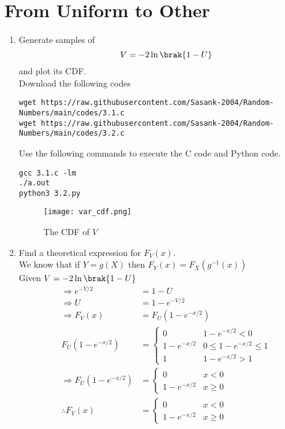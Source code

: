 \documentclass[journal,12pt,twocolumn]{IEEEtran}
\renewcommand\thesection{\arabic{section}}
\begin{document}
\section{From Uniform to Other}
\begin{enumerate}[label=\thesection.\arabic*
,ref=\thesection.\theenumi]
%
\item
Generate samples of 
%
\begin{equation}
V = -2\ln\brak{1-U}
\end{equation}
%
and plot its CDF.  \\
\solution Download the following codes
\begin{lstlisting}
wget https://raw.githubusercontent.com/Sasank-2004/Random-Numbers/main/codes/3.1.c
wget https://raw.githubusercontent.com/Sasank-2004/Random-Numbers/main/codes/3.2.c
\end{lstlisting}
Use the following commands to execute the C code and Python code.
\begin{lstlisting}
gcc 3.1.c -lm
./a.out
python3 3.2.py
\end{lstlisting}
\begin{figure}[h]
\centering
\texttt{[image: var\_cdf.png]}
\caption{The CDF of $V$}
\label{fig:var_cdf}
\end{figure}
\item Find a theoretical expression for $F_V(x)$.\\
\solution We know that if $Y=g(X)$ then $F_Y(x) = F_X(g^{-1}(x))$ \\
Given $V = -2\ln\brak{1-U}$
\begin{align}
    \Rightarrow e^{-V/2} &= 1 -U \\
    \Rightarrow U &= 1 - e^{-V/2} \\
    \Rightarrow F_V(x) &= F_U(1-e^{-x/2}) \\
    F_U(1-e^{-x/2}) &= 
    \begin{cases}
    0 &   1-e^{-x/2} < 0 \\
    1-e^{-x/2} &  0 \le 1-e^{-x/2} \le 1 \\
    1 &  1-e^{-x/2} > 1
    \end{cases} \\
    \Rightarrow  F_U(1-e^{-x/2}) &= 
    \begin{cases}
    0 & x < 0 \\
    1-e^{-x/2} & x \ge 0 
    \end{cases}\\
    \therefore F_V(x) &= 
    \begin{cases}
    0 & x < 0 \\
    1-e^{-x/2} & x \ge 0 
    \end{cases}
\end{align}


%
\end{enumerate}
\end{document}
